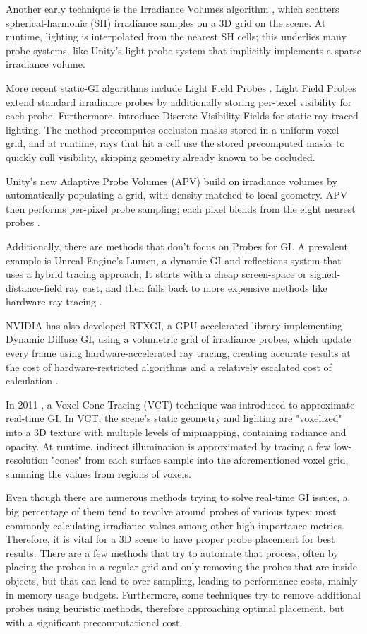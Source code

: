 Another early technique is the Irradiance Volumes algorithm  \parencite{Greger1998}, which scatters spherical-harmonic (SH) irradiance samples on a 3D grid on the scene. At runtime, lighting is interpolated from the nearest SH cells; this underlies many probe systems, like Unity's light-probe system that implicitly implements a sparse irradiance volume.

More recent static-GI algorithms include Light Field Probes \parencite{McGuire2017}. Light Field Probes extend standard irradiance probes by additionally storing per-texel visibility for each probe. Furthermore, \parencite{Xu2022} introduce Discrete Visibility Fields for static ray-traced lighting. The method precomputes occlusion masks stored in a uniform voxel grid, and at runtime, rays that hit a cell use the stored precomputed masks to quickly cull visibility, skipping geometry already known to be occluded.

Unity's new Adaptive Probe Volumes (APV) build on irradiance volumes by automatically populating a grid, with density matched to local geometry. APV then performs per-pixel probe sampling; each pixel blends from the eight nearest probes \parencite{Unity2025}.

Additionally, there are methods that don't focus on Probes for GI. A prevalent example is Unreal Engine's Lumen, a dynamic GI and reflections system that uses a hybrid tracing approach; It starts with a cheap screen-space or signed-distance-field ray cast, and then falls back to more expensive methods like hardware ray tracing \parencite{Unreal2025}.

NVIDIA has also developed RTXGI, a GPU-accelerated library implementing Dynamic Diffuse GI, using a volumetric grid of irradiance probes, which update every frame using hardware-accelerated ray tracing, creating accurate results at the cost of hardware-restricted algorithms and a relatively escalated cost of calculation \parencite{Nvidia2024}.

In 2011 \parencite{Crassin2011} , a Voxel Cone Tracing (VCT) technique was introduced to approximate real-time GI. In VCT, the scene's static geometry and lighting are "voxelized" into a 3D texture with multiple levels of mipmapping, containing radiance and opacity. At runtime, indirect illumination is approximated by tracing a few low-resolution "cones" from each surface sample into the aforementioned voxel grid, summing the values from regions of voxels.\newline

Even though there are numerous methods trying to solve real-time GI issues, a big percentage of them tend to revolve around probes of various types; most commonly calculating irradiance values among other high-importance metrics. Therefore, it is vital for a 3D scene to have proper probe placement for best results. There are a few methods that try to automate that process, often by placing the probes in a regular grid and only removing the probes that are inside objects, but that can lead to over-sampling, leading to performance costs, mainly in memory usage budgets. Furthermore, some techniques try to remove additional probes using heuristic methods, therefore approaching optimal placement, but with a significant precomputational cost.

